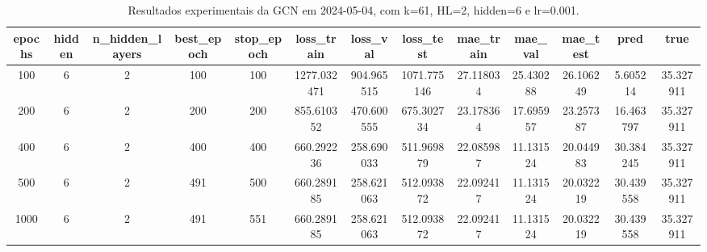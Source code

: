 \begin{table}[h]
\centering
\caption{Resultados experimentais da GCN em 2024-05-04, com k=61, HL=2, hidden=6 e lr=0.001.}
\label{tab:gcn_results_k61_hl2_h6_d20240504}
\begin{tabular}{ccccccccccccc}
\toprule
epochs & hidden & n\_hidden\_layers & best\_epoch & stop\_epoch & loss\_train & loss\_val & loss\_test & mae\_train & mae\_val & mae\_test & pred & true \\
\midrule
100 & 6 & 2 & 100 & 100 & 1277.032471 & 904.965515 & 1071.775146 & 27.118034 & 25.430288 & 26.106249 & 5.605214 & 35.327911 \\
200 & 6 & 2 & 200 & 200 & 855.610352 & 470.600555 & 675.302734 & 23.178364 & 17.695957 & 23.257387 & 16.463797 & 35.327911 \\
400 & 6 & 2 & 400 & 400 & 660.292236 & 258.690033 & 511.969879 & 22.085987 & 11.131524 & 20.044983 & 30.384245 & 35.327911 \\
500 & 6 & 2 & 491 & 500 & 660.289185 & 258.621063 & 512.093872 & 22.092417 & 11.131524 & 20.032219 & 30.439558 & 35.327911 \\
1000 & 6 & 2 & 491 & 551 & 660.289185 & 258.621063 & 512.093872 & 22.092417 & 11.131524 & 20.032219 & 30.439558 & 35.327911 \\
\bottomrule
\end{tabular}
\end{table}
